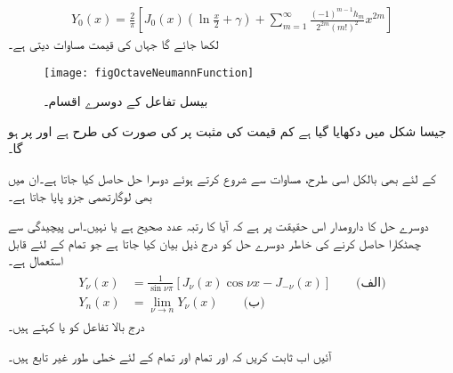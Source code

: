 \begin{align}\label{مساوات_بیسل_نیومن_درجہ_صفر}
Y_0(x)=\frac{2}{\pi}\left[J_0(x) \left(\ln \frac{x}{2}+\gamma\right)+\sum_{m=1}^{\infty} \frac{(-1)^{m-1} h_m}{2^{2m}(m!)^2}x^{2m}\right]
\end{align}
لکھا جائے گا جہاں  کی قیمت مساوات   دیتی ہے۔
\begin{figure}
\centering
\texttt{[image: figOctaveNeumannFunction]}
\caption{بیسل تفاعل کے دوسرے اقسام۔}
\label{شکل_بیسل_نیومن_درجہ_صفر}
\end{figure}
جیسا شکل  میں دکھایا گیا ہے کم قیمت کی مثبت  پر  کی صورت  کی طرح ہے اور  پر  ہو گا۔

 کے لئے بھی بالکل اسی طرح، مساوات  سے شروع کرتے ہوئے  دوسرا حل حاصل کیا جاتا ہے۔ان میں بھی لوگارتھمی جزو پایا جاتا ہے۔

دوسرے حل کا دارومدار اس حقیقت پر ہے کہ آیا  کا رتبہ عدد صحیح ہے یا نہیں۔اس پیچیدگی  سے چھٹکارا حاصل کرنے کی خاطر دوسرے حل کو درج ذیل بیان کیا جاتا ہے جو تمام  کے لئے قابل استعمال ہے۔
\begin{gather}
\begin{aligned}\label{مساوات_بیسل_نیومن_عمومی_حل_الف}
Y_{\nu}(x)&=\frac{1}{\sin \nu \pi} [J_{\nu}(x)\cos \nu x-J_{-\nu}(x)] \quad \quad \text{(الف)}\\
Y_n(x)&=\lim_{\nu \to n} Y_{\nu}(x)\quad \quad \text{(ب)}
\end{aligned}
\end{gather}
درج بالا تفاعل کو  یا  کہتے ہیں۔ 

آئیں اب ثابت کریں کہ  اور  تمام  اور تمام  کے لئے خطی طور غیر تابع ہیں۔

